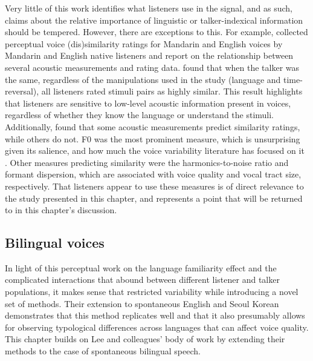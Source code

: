 Very little of this work identifies what listeners use in the signal, and as such, claims about the relative importance of linguistic or talker-indexical information should be tempered. However, there are exceptions to this. For example, \citet{perrachione_2019_judgments} collected perceptual voice (dis)similarity ratings for Mandarin and English voices by Mandarin and English native listeners and report on the relationship between several acoustic measurements and rating data. \citet{perrachione_2019_judgments} found that when the talker was the same, regardless of the manipulations used in the study (language and time-reversal), all listeners rated stimuli pairs as highly similar. This result highlights that listeners are sensitive to low-level acoustic information present in voices, regardless of whether they know the language or understand the stimuli. Additionally, \citet{perrachione_2019_judgments} found that some acoustic measurements predict similarity ratings, while others do not. F0 was the most prominent measure, which is unsurprising given its salience, and how much the voice variability literature has focused on it \cite[e.g.,][]{keating_2012_f0}. Other measures predicting similarity were the harmonics-to-noise ratio and formant dispersion, which are associated with voice quality and vocal tract size, respectively. That listeners appear to use these measures is of direct relevance to the study presented in this chapter, and represents a point that will be returned to in this chapter's discussion.

\subsection{Bilingual voices}\label{ch3:sec:clxcomparisons}

In light of this perceptual work on the language familiarity effect and the complicated interactions that abound between different listener and talker populations, it makes sense that \citet{lee_2019_acoustic} restricted variability while introducing a novel set of methods. Their extension to spontaneous English and Seoul Korean demonstrates that this method replicates well and that it also presumably allows for observing typological differences across languages that can affect voice quality. This chapter builds on Lee and colleagues' body of work by extending their methods to the case of spontaneous bilingual speech. 


